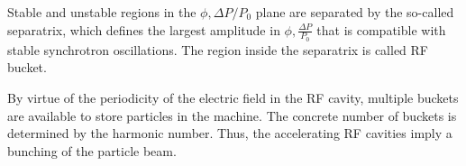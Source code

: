 Stable and unstable regions in the $\phi, \Delta P/P_0$ plane are separated by the so-called separatrix, which defines the largest amplitude in $\phi, \frac{\Delta P}{P_0}$ that is compatible with stable synchrotron oscillations. The region inside the separatrix is called RF bucket. 

By virtue of the periodicity of the electric field in the RF cavity, multiple buckets are available to store particles in the machine. The concrete number of buckets is determined by the harmonic number. Thus, the accelerating RF cavities imply a bunching of the particle beam. 




